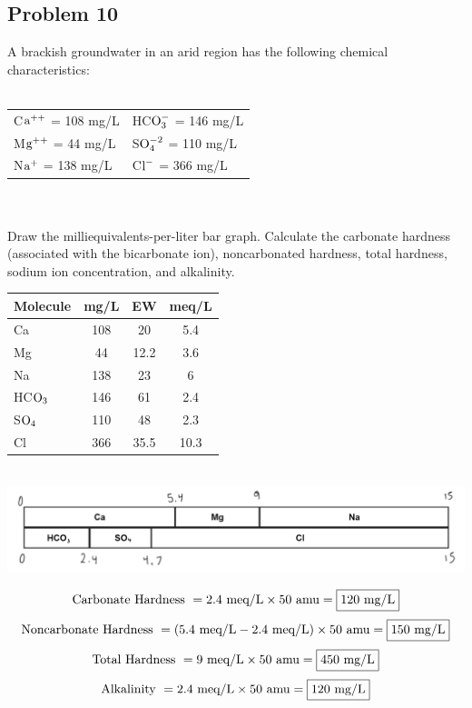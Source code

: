 \subsection*{Problem 10}
A brackish groundwater in an arid region has the following chemical characteristics:\\\\
\begin{tabular}{l l}
    C\(\textnormal{a}^{++}\) = 108 mg/L & HC\(\textnormal{O}_{3}^-\) = 146 mg/L \\
    M\(\textnormal{g}^{++}\) = 44 mg/L & S\(\textnormal{O}_{4}^{-2}\) = 110 mg/L \\
    N\(\textnormal{a}^{+}\) = 138 mg/L  &  C\(\textnormal{l}^{-}\) = 366 mg/L\\
\end{tabular}
\\\\
Draw the milliequivalents-per-liter bar graph. Calculate the carbonate hardness (associated with the bicarbonate ion), noncarbonated hardness, total hardness, sodium ion concentration, and alkalinity.
\\
\begin{center}
\begin{tabular}{l c c c}
    Molecule & mg/L & EW & meq/L\\
    \hline
    Ca & 108 & 20 & 5.4\\
    Mg & 44 & 12.2 & 3.6\\
    Na & 138 & 23 & 6\\
    HC\(\textnormal{O}_3\) & 146 & 61 & 2.4\\
    S\(\textnormal{O}_4\) & 110 & 48 & 2.3\\
    Cl & 366 & 35.5 & 10.3
\end{tabular}\\
\includegraphics[scale=0.33]{diagram2.png}
\end{center}
\[\textnormal{Carbonate Hardness }=2.4\textnormal{ meq/L}\times 50\textnormal{ amu}=\boxed{120 \textnormal{ mg/L}}\]
\[\textnormal{Noncarbonate Hardness }=(5.4\textnormal{ meq/L}-2.4\textnormal{ meq/L})\times 50\textnormal{ amu}=\boxed{150 \textnormal{ mg/L}}\]
\[\textnormal{Total Hardness }=9\textnormal{ meq/L}\times 50\textnormal{ amu}=\boxed{450 \textnormal{ mg/L}}\]
\[\textnormal{Alkalinity }=2.4\textnormal{ meq/L}\times 50\textnormal{ amu}=\boxed{120 \textnormal{ mg/L}}\]
\newpage
